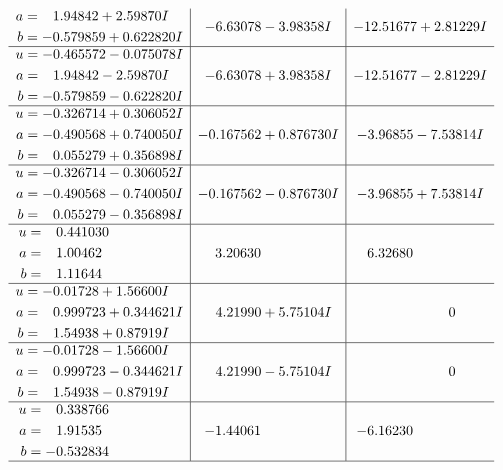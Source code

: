 \documentclass[1p]{elsarticle_modified}
\theoremstyle{definition}
\begin{document}
$$\begin{array}{c|c|c}
\begin{aligned}
a &= \phantom{-}1.94842 + 2.59870 I \\
b &= -0.579859 + 0.622820 I\end{aligned}
 & -6.63078 - 3.98358 I & -12.51677 + 2.81229 I \\ \hline\begin{aligned}
u &= -0.465572 - 0.075078 I \\
a &= \phantom{-}1.94842 - 2.59870 I \\
b &= -0.579859 - 0.622820 I\end{aligned}
 & -6.63078 + 3.98358 I & -12.51677 - 2.81229 I \\ \hline\begin{aligned}
u &= -0.326714 + 0.306052 I \\
a &= -0.490568 + 0.740050 I \\
b &= \phantom{-}0.055279 + 0.356898 I\end{aligned}
 & -0.167562 + 0.876730 I & -3.96855 - 7.53814 I \\ \hline\begin{aligned}
u &= -0.326714 - 0.306052 I \\
a &= -0.490568 - 0.740050 I \\
b &= \phantom{-}0.055279 - 0.356898 I\end{aligned}
 & -0.167562 - 0.876730 I & -3.96855 + 7.53814 I \\ \hline\begin{aligned}
u &= \phantom{-}0.441030\phantom{ +0.000000I} \\
a &= \phantom{-}1.00462\phantom{ +0.000000I} \\
b &= \phantom{-}1.11644\phantom{ +0.000000I}\end{aligned}
 & \phantom{-}3.20630\phantom{ +0.000000I} & \phantom{-}6.32680\phantom{ +0.000000I} \\ \hline\begin{aligned}
u &= -0.01728 + 1.56600 I \\
a &= \phantom{-}0.999723 + 0.344621 I \\
b &= \phantom{-}1.54938 + 0.87919 I\end{aligned}
 & \phantom{-}4.21990 + 5.75104 I & \phantom{-0.000000 } 0 \\ \hline\begin{aligned}
u &= -0.01728 - 1.56600 I \\
a &= \phantom{-}0.999723 - 0.344621 I \\
b &= \phantom{-}1.54938 - 0.87919 I\end{aligned}
 & \phantom{-}4.21990 - 5.75104 I & \phantom{-0.000000 } 0 \\ \hline\begin{aligned}
u &= \phantom{-}0.338766\phantom{ +0.000000I} \\
a &= \phantom{-}1.91535\phantom{ +0.000000I} \\
b &= -0.532834\phantom{ +0.000000I}\end{aligned}
 & -1.44061\phantom{ +0.000000I} & -6.16230\phantom{ +0.000000I}\\
 \hline 
 \end{array}$$\newpage\newpage\renewcommand{\arraystretch}{1}
\end{document}
